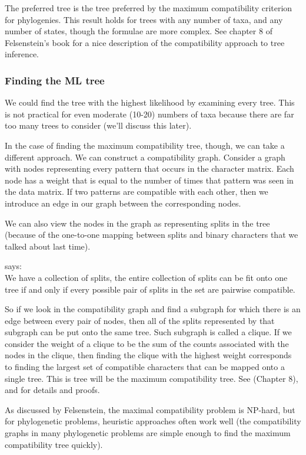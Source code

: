 \documentclass[11pt]{article}
\begin{document}
The preferred tree is the tree preferred by the maximum compatibility criterion for phylogenies.
This result holds for trees with any number of taxa, and any number of states, though the formulae are
more complex.
See chapter 8 of Felsenstein's book for a nice description of the compatibility approach to
tree inference.


\subsubsection*{Finding the ML tree}
We could find the tree with the highest likelihood by examining every tree. 
This is not practical for even moderate (10-20) numbers of taxa because there are far too many trees
to consider (we'll discuss this later).

In the case of finding the maximum compatibility tree, though, we can take a different approach.
We can construct a compatibility graph.
Consider a graph with nodes representing every pattern that occurs in the character matrix.
Each node has a weight that is equal to the number of times that pattern was seen in the data matrix.
If two patterns are compatible with each other, then we introduce an edge in our graph between the
corresponding nodes.

We can also view the nodes in the graph as representing splits in the tree (because of the one-to-one mapping
between splits and binary characters that we talked about last time).

 says:\\
We have a collection of splits,  the entire collection of splits can be fit onto one tree if and only if
every possible pair of splits in the set are pairwise compatible.


So if we look in the compatibility graph and find a subgraph for which there is an edge 
between every pair of nodes, then all of the splits represented by that subgraph can be 
put onto the same tree.
Such subgraph is called a clique.
If we consider the weight of a clique to be the sum of the counts associated with the
nodes in the clique, then finding the clique with the highest weight corresponds 
to finding the largest set of compatible characters that can be mapped onto a single 
tree.
This is tree will be the maximum compatibility tree.
See \citet{Felsenstein2004} (Chapter 8), \citep{Buneman1971} and   \citep{EstabrookM1980} for details and 
proofs.

As discussed by Felsenstein, the maximal compatibility problem is NP-hard, but for
phylogenetic problems, heuristic approaches often work well (the compatibility graphs
in many phylogenetic problems are simple enough to find the maximum compatibility 
tree quickly).
\end{document}
